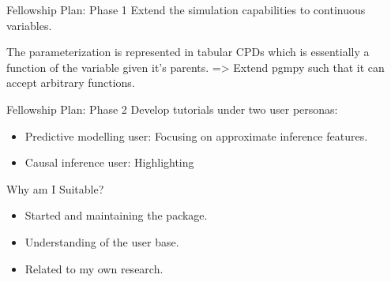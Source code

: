 \documentclass{beamer}
\begin{document}
\begin{frame}{Fellowship Plan: Phase 1}
	Extend the simulation capabilities to continuous variables.


	The parameterization is represented in tabular CPDs which is essentially a function of the variable given it's parents. => Extend pgmpy such that it can accept arbitrary functions.
\end{frame}

\begin{frame}{Fellowship Plan: Phase 2}
	Develop tutorials under two user personas:

	\begin{itemize}
		\item Predictive modelling user: Focusing on approximate inference features.
		\item Causal inference user: Highlighting 
	\end{itemize}
\end{frame}

\begin{frame}{Why am I Suitable?}
	\begin{itemize}
		\item Started and maintaining the package.
		\item Understanding of the user base. 
		\item Related to my own research.
	\end{itemize}
\end{frame}
\end{document}
